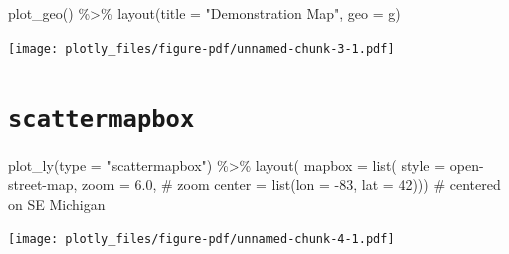 \documentclass[
  letterpaper,
  DIV=11,
  numbers=noendperiod,
  oneside]{scrreprt}
\newenvironment{Shaded}{\begin{snugshade}}{\end{snugshade}}
\newcommand{\AttributeTok}[1]{\textcolor[rgb]{0.40,0.45,0.13}{#1}}
\newcommand{\CommentTok}[1]{\textcolor[rgb]{0.37,0.37,0.37}{#1}}
\newcommand{\DecValTok}[1]{\textcolor[rgb]{0.68,0.00,0.00}{#1}}
\newcommand{\FloatTok}[1]{\textcolor[rgb]{0.68,0.00,0.00}{#1}}
\newcommand{\FunctionTok}[1]{\textcolor[rgb]{0.28,0.35,0.67}{#1}}
\newcommand{\NormalTok}[1]{\textcolor[rgb]{0.00,0.23,0.31}{#1}}
\newcommand{\SpecialCharTok}[1]{\textcolor[rgb]{0.37,0.37,0.37}{#1}}
\newcommand{\StringTok}[1]{\textcolor[rgb]{0.13,0.47,0.30}{#1}}
\begin{document}
\begin{Shaded}
\begin{Highlighting}[]
\FunctionTok{plot\_geo}\NormalTok{() }\SpecialCharTok{\%\textgreater{}\%} 
  \FunctionTok{layout}\NormalTok{(}\AttributeTok{title =} \StringTok{"Demonstration Map"}\NormalTok{, }
         \AttributeTok{geo =}\NormalTok{ g)}
\end{Highlighting}
\end{Shaded}

\texttt{[image: plotly\_files/figure-pdf/unnamed-chunk-3-1.pdf]}

\section{\texorpdfstring{\texttt{scattermapbox}}{scattermapbox}}\label{scattermapbox}

\begin{Shaded}
\begin{Highlighting}[]
\FunctionTok{plot\_ly}\NormalTok{(}\AttributeTok{type =} \StringTok{"scattermapbox"}\NormalTok{) }\SpecialCharTok{\%\textgreater{}\%}
  \FunctionTok{layout}\NormalTok{(}
    \AttributeTok{mapbox =} \FunctionTok{list}\NormalTok{(}
      \AttributeTok{style =} \StringTok{\textquotesingle{}open{-}street{-}map\textquotesingle{}}\NormalTok{,}
      \AttributeTok{zoom =} \FloatTok{6.0}\NormalTok{, }\CommentTok{\# zoom}
      \AttributeTok{center =} \FunctionTok{list}\NormalTok{(}\AttributeTok{lon =} \SpecialCharTok{{-}}\DecValTok{83}\NormalTok{, }\AttributeTok{lat =} \DecValTok{42}\NormalTok{))) }\CommentTok{\# centered on SE Michigan}
\end{Highlighting}
\end{Shaded}

\texttt{[image: plotly\_files/figure-pdf/unnamed-chunk-4-1.pdf]}
\end{document}
